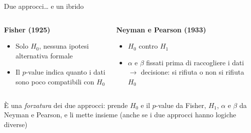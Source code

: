 \documentclass[
  ignorenonframetext,
  compress, aspectratio=149]{beamer}
\providecommand{\tightlist}{%
  \setlength{\itemsep}{0pt}\setlength{\parskip}{0pt}}
\begin{document}
\begin{frame}{Due approcci\ldots{} e un ibrido}
\label{due-approcci-e-un-ibrido}
\small

\begin{columns}[T]
\begin{column}{0.5\linewidth}
\textbf{Fisher (1925)}

\begin{itemize}
\tightlist
\item
  Solo \(H_0\), nessuna ipotesi alternativa formale
\item
  Il \(p\)-value indica quanto i dati sono poco compatibili con \(H_0\)
\end{itemize}
\end{column}

\begin{column}{0.5\linewidth}
\textbf{Neyman e Pearson (1933)}

\begin{itemize}
\tightlist
\item
  \(H_0\) contro \(H_1\)
\item
  \(\alpha\) e \(\beta\) fissati prima di raccogliere i dati
  \(\rightarrow\) decisione: si rifiuta o non si rifiuta \(H_0\)
\end{itemize}
\end{column}
\end{columns}

\vspace{3mm}

\begin{tcolorbox}[enhanced jigsaw, opacityback=0, bottomtitle=1mm, bottomrule=.15mm, titlerule=0mm, coltitle=black, toprule=.15mm, breakable, toptitle=1mm, colbacktitle=quarto-callout-important-color!10!white, arc=.35mm, title={NHST}, rightrule=.15mm, leftrule=.75mm, opacitybacktitle=0.6, left=2mm, colframe=quarto-callout-important-color-frame, colback=white]

È una \emph{forzatura} dei due approcci: prende \(H_0\) e il \(p\)-value
da Fisher, \(H_1\), \(\alpha\) e \(\beta\) da Neyman e Pearson, e li
mette insieme (anche se i due approcci hanno logiche diverse)

\end{tcolorbox}
\end{frame}
\end{document}
